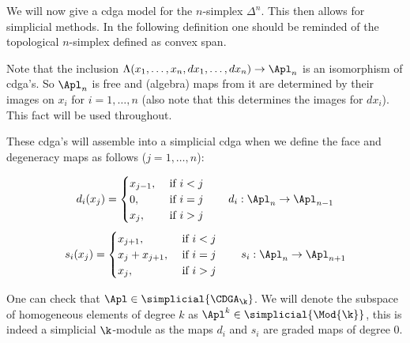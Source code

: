 
We will now give a cdga model for the $n$-simplex $\Delta^n$. This then allows for simplicial methods. In the following definition one should be reminded of the topological $n$-simplex defined as convex span.


Note that the inclusion $\Lambda(x_1, \ldots, x_n, d x_1, \ldots, d x_n) \to \Apl_n$ is an isomorphism of cdga's. So $\Apl_n$ is free and (algebra) maps from it are determined by their images on $x_i$ for $i = 1, \ldots, n$ (also note that this determines the images for $d x_i$). This fact will be used throughout.

These cdga's will assemble into a simplicial cdga when we define the face and degeneracy maps as follows ($j = 1, \ldots, n$):

$$ d_i(x_j) = \begin{cases}
	x_{j-1}, &\text{ if } i < j \\
	0,       &\text{ if } i = j \\
	x_j,     &\text{ if } i > j
\end{cases} \qquad d_i : \Apl_n \to \Apl_{n-1} $$
$$ s_i(x_j) = \begin{cases}
	x_{j+1},       &\text{ if } i < j \\
	x_j + x_{j+1}, &\text{ if } i = j \\
	x_j,           &\text{ if } i > j	
\end{cases} \qquad s_i : \Apl_n \to \Apl_{n+1} $$

One can check that $\Apl \in \simplicial{\CDGA_\k}$. We will denote the subspace of homogeneous elements of degree $k$ as $\Apl^k \in \simplicial{\Mod{\k}}$, this is indeed a simplicial $\k$-module as the maps $d_i$ and $s_i$ are graded maps of degree $0$.


